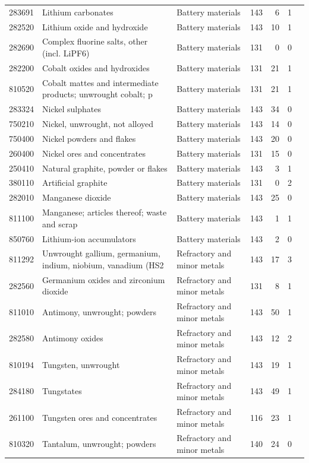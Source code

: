 \begin{minipage}{\linewidth}
\begin{tabular}{llp{3.2cm}rrrl}
283691 & Lithium carbonates & Battery materials & 143 & 6 & 1 &  \\
282520 & Lithium oxide and hydroxide & Battery materials & 143 & 10 & 1 &  \\
282690 & Complex fluorine salts, other (incl. LiPF6) & Battery materials & 131 & 0 & 0 &  \\
282200 & Cobalt oxides and hydroxides & Battery materials & 131 & 21 & 1 &  \\
810520 & Cobalt mattes and intermediate products; unwrought cobalt; p & Battery materials & 131 & 21 & 1 &  \\
283324 & Nickel sulphates & Battery materials & 143 & 34 & 0 &  \\
750210 & Nickel, unwrought, not alloyed & Battery materials & 143 & 14 & 0 &  \\
750400 & Nickel powders and flakes & Battery materials & 143 & 20 & 0 &  \\
260400 & Nickel ores and concentrates & Battery materials & 131 & 15 & 0 &  \\
250410 & Natural graphite, powder or flakes & Battery materials & 143 & 3 & 1 &  \\
380110 & Artificial graphite & Battery materials & 131 & 0 & 2 &  \\
282010 & Manganese dioxide & Battery materials & 143 & 25 & 0 &  \\
811100 & Manganese; articles thereof; waste and scrap & Battery materials & 143 & 1 & 1 &  \\
850760 & Lithium-ion accumulators & Battery materials & 143 & 2 & 0 &  \\
811292 & Unwrought gallium, germanium, indium, niobium, vanadium (HS2 & Refractory and minor metals & 143 & 17 & 3 &  \\
282560 & Germanium oxides and zirconium dioxide & Refractory and minor metals & 131 & 8 & 1 &  \\
811010 & Antimony, unwrought; powders & Refractory and minor metals & 143 & 50 & 1 &  \\
282580 & Antimony oxides & Refractory and minor metals & 143 & 12 & 2 &  \\
810194 & Tungsten, unwrought & Refractory and minor metals & 143 & 19 & 1 &  \\
284180 & Tungstates & Refractory and minor metals & 143 & 49 & 1 &  \\
261100 & Tungsten ores and concentrates & Refractory and minor metals & 116 & 23 & 1 &  \\
810320 & Tantalum, unwrought; powders & Refractory and minor metals & 140 & 24 & 0 &  \\

\end{tabular}
\end{minipage}
